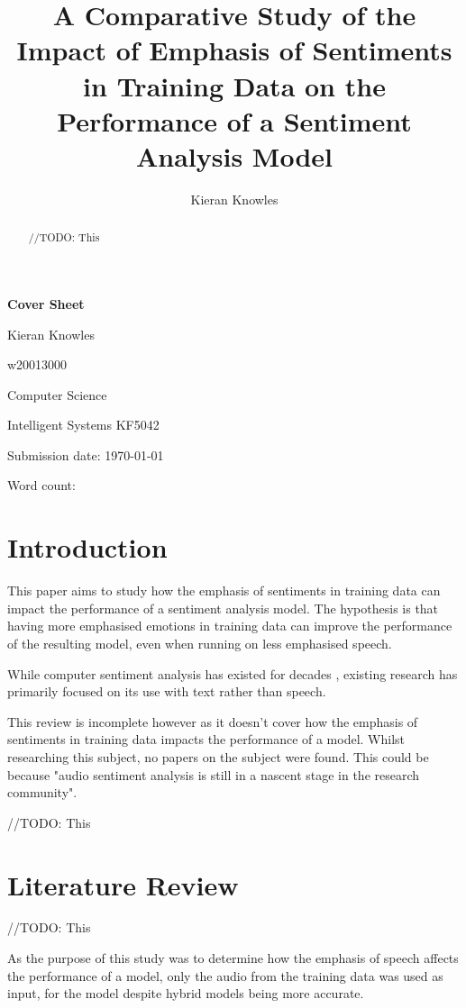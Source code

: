\documentclass[journal]{IEEEtran}
\newcommand\wordcount{
    
}
\begin{document}
{\Large \textbf{Cover Sheet}}

Kieran Knowles

w20013000

Computer Science

Intelligent Systems KF5042

Submission date: \today

Word count: \wordcount

\title{A Comparative Study of the Impact of Emphasis of Sentiments in Training Data on the Performance of a Sentiment Analysis Model}
\author{Kieran Knowles}
\maketitle


\begin{abstract}
    //TODO: This

\end{abstract}

\section{Introduction}
This paper aims to study how the emphasis of sentiments in training data can impact the performance of a sentiment analysis
model. The hypothesis is that having more emphasised emotions in training data can improve the performance of the resulting
model, even when running on less emphasised speech.

While computer sentiment analysis has existed for decades \cite{stone_computer_1963}, existing research has primarily focused on
its use with text rather than speech. \cite{maghilnan_sentiment_2017}

This review is incomplete however as it doesn't cover how the emphasis of sentiments in training data impacts the performance of a model.
Whilst researching this subject, no papers on the subject were found.
This could be because "audio sentiment analysis is still in a nascent stage
in the research community". \cite{maghilnan_sentiment_2017}

//TODO: This

\section{Literature Review}

//TODO: This

As the purpose of this study was to determine how the emphasis of speech affects
the performance of a model, only the audio from the training data was used as input,
for the model despite hybrid models being more accurate. \cite{bhaskar_hybrid_2015}
\end{document}
